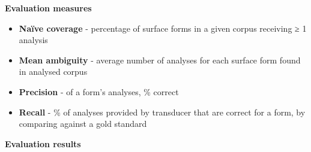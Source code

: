 \documentclass[fontscale=0.3,landscape,paperwidth=72in,paperheight=36in]{baposter}  %
\newcommand{\htwo}[1]{{\htwofont \textbf{\dotfill{}#1\dotfill{}}}}
\begin{document}
\begin{poster}
{%
			\htwo{Evaluation measures}
			\begin{itemize}
				\item \textbf{Naïve coverage} - percentage of surface forms in a given corpus receiving ≥ 1 analysis%
				\item \textbf{Mean ambiguity} - average number of analyses for each surface form found in analysed corpus
				\item \textbf{Precision} - of a form's analyses, \% correct
				\item \textbf{Recall} - \% of analyses provided by transducer that are correct for a form, by comparing against a gold standard
			\end{itemize}
			\htwo{Evaluation results}

		}
\end{poster}
\end{document}
